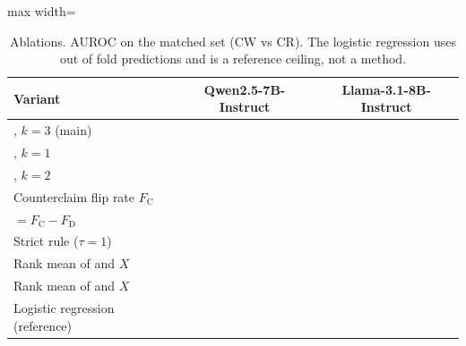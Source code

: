 \begin{table}[t]
\centering
\footnotesize
\caption{Ablations. AUROC on the matched set (CW vs CR). The logistic regression uses out of fold predictions and is a reference ceiling, not a method.}
\label{tab:ablation}
\begin{adjustbox}{max width=\columnwidth}
\begin{tabular}{lcc}
\toprule
Variant & Qwen2.5-7B-Instruct & Llama-3.1-8B-Instruct \\
\midrule
\dfr{}, $k=3$ (main) & \TODO{} & \TODO{} \\
\dfr{}, $k=1$ & \TODO{} & \TODO{} \\
\dfr{}, $k=2$ & \TODO{} & \TODO{} \\
Counterclaim flip rate $F_{\mathrm{C}}$ & \TODO{} & \TODO{} \\
\cps{} $=F_{\mathrm{C}}-F_{\mathrm{D}}$ & \TODO{} & \TODO{} \\
Strict rule ($\tau=1$) & \TODO{} & \TODO{} \\
Rank mean of \dfr{} and $X$ & \TODO{} & \TODO{} \\
Rank mean of \cps{} and $X$ & \TODO{} & \TODO{} \\
Logistic regression (reference) & \TODO{} & \TODO{} \\
\bottomrule
\end{tabular}
\end{adjustbox}
\end{table}
